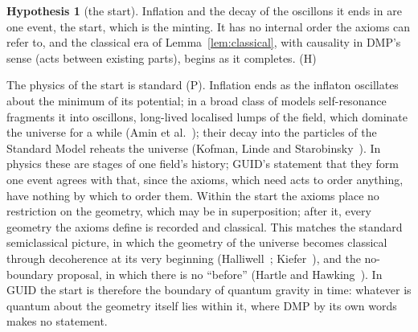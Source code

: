 \documentclass[11pt,a4paper]{article}
\theoremstyle{definition}
\newtheorem{hypothesis}{Hypothesis}
\theoremstyle{remark}
\newcommand{\tagH}{\textsf{(H)}}
\newcommand{\tagP}{\textsf{(P)}}
\theoremstyle{definition}
\begin{document}
\begin{hypothesis}[the start]\label{h:minting}
Inflation and the decay of the oscillons it ends in are one event, the start, which is the minting. It has no internal order the axioms can
refer to, and the classical era of Lemma~\ref{lem:classical}, with causality in DMP's sense (acts between existing parts), begins as it
completes. \tagH
\end{hypothesis}

The physics of the start is standard \tagP. Inflation ends as the inflaton oscillates about the minimum of its potential; in a broad class
of models self-resonance fragments it into oscillons, long-lived localised lumps of the field, which dominate the universe for a while
(Amin et al.~\cite{amin}); their decay into the particles of the Standard Model reheats the universe (Kofman, Linde and
Starobinsky~\cite{kls}). In physics these are stages of one field's history; GUID's statement that they form one event agrees with that,
since the axioms, which need acts to order anything, have nothing by which to order them. Within the start the axioms place no restriction
on the geometry, which may be in superposition; after it, every geometry the axioms define is recorded and classical. This matches the
standard semiclassical picture, in which the geometry of the universe becomes classical through decoherence at its very beginning
(Halliwell~\cite{halliwell}; Kiefer~\cite{kiefer87}), and the no-boundary proposal, in which there is no ``before'' (Hartle and
Hawking~\cite{hartlehawking}). In GUID the start is therefore the boundary of quantum gravity in time: whatever is quantum about the
geometry itself lies within it, where DMP by its own words makes no statement.
\end{document}
